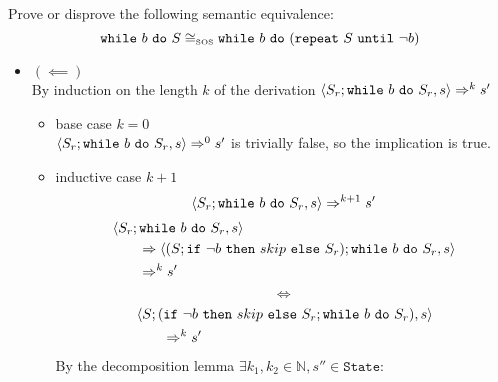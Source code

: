 \begin{exercise}{
    Prove or disprove the following semantic equivalence:
    \[ \texttt{while}\ b\ \texttt{do}\ S \cong_{\text{\tiny SOS}} \texttt{while}\ b\ \texttt{do}\ (\texttt{repeat}\ S\ \texttt{until}\ \neg b)  \]\vspace*{-0.6cm}
}
\begin{itemize}
\begin{itemize}
\begin{itemize}
\begin{itemize}
\begin{align*}
                                        \\
                                        &\instr{\wif{\neg b}{skip}{S_r}; \wwhile{b}{S_r}}{s''}
                                        \\&\qquad\Rightarrow \instr{S_r; \wwhile{b}{S_r}}{s''}
                                    \end{align*}
                                    Since $\instr{S; \wwhile{b}{S}}{s''} \Rightarrow^{k_2 - 2} s'$ and $k_2 - 2 = k - k_1 - 1 \leq k$ the inductive hypothesis holds and thus $\instr{S_r; \wwhile{b}{S_r}}{s''} \Rightarrow^* s'$
                            \end{itemize}
                    \end{itemize}
                \item $(\impliedby)$ \vspace{0.2cm} \\
                    By induction on the length $k$ of the derivation $\left<S_r; \texttt{while}\ b\ \texttt{do}\ S_r, s\right> \Rightarrow^k s'$
                    \begin{itemize}
                        \item base case $k=0$ \\
                            $\left<S_r; \texttt{while}\ b\ \texttt{do}\ S_r, s\right> \Rightarrow^0 s'$ is trivially false, so the implication is true.
                        \item inductive case $k+1$ \vspace*{-0.3cm}
                        \[ \left<S_r; \texttt{while}\ b\ \texttt{do}\ S_r, s\right> \Rightarrow^{k+1} s' \]
                        \begin{align*}
                            &\left<S_r; \texttt{while}\ b\ \texttt{do}\ S_r, s\right>
                            \\&\qquad\Rightarrow \left<(S; \texttt{if}\ \neg b\ \texttt{then}\ skip\ \texttt{else}\ S_r); \texttt{while}\ b\ \texttt{do}\ S_r, s\right>
                            \\&\qquad\Rightarrow^{k} s'
                        \end{align*}
                        \[ \iff \]
                        \begin{align*}
                            &\left<S; (\texttt{if}\ \neg b\ \texttt{then}\ skip\ \texttt{else}\ S_r; \texttt{while}\ b\ \texttt{do}\ S_r), s\right>
                            \\&\qquad\Rightarrow^{k} s'
                        \end{align*}
                        By the decomposition lemma $\exists k_1, k_2 \in \mathbb{N}, s'' \in \texttt{State} :$
                        \begin{gather*}

\end{gather*}
\end{itemize}
\end{itemize}
\end{itemize}
\end{exercise}
